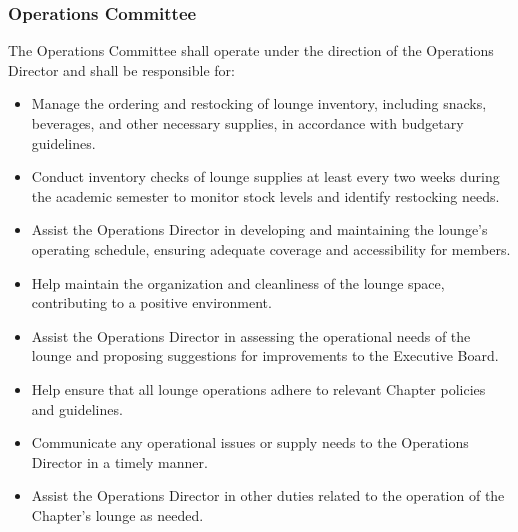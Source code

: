 \documentclass[10pt, oneside]{article}
\begin{document}
\subsubsection{Operations Committee}
The Operations Committee shall operate under the direction of the Operations Director and shall be responsible for:
\begin{itemize}
    \item Manage the ordering and restocking of lounge inventory, including snacks, beverages, and other necessary supplies, in accordance with budgetary guidelines.
    \item Conduct inventory checks of lounge supplies at least every two weeks during the academic semester to monitor stock levels and identify restocking needs.
    \item Assist the Operations Director in developing and maintaining the lounge's operating schedule, ensuring adequate coverage and accessibility for members.
    \item Help maintain the organization and cleanliness of the lounge space, contributing to a positive environment.
    \item Assist the Operations Director in assessing the operational needs of the lounge and proposing suggestions for improvements to the Executive Board.
    \item Help ensure that all lounge operations adhere to relevant Chapter policies and guidelines.
    \item Communicate any operational issues or supply needs to the Operations Director in a timely manner.
    \item Assist the Operations Director in other duties related to the operation of the Chapter's lounge as needed.
\end{itemize}
\end{document}
